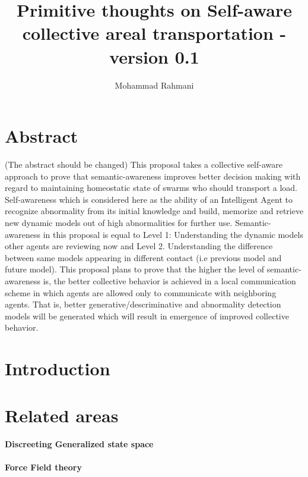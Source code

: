 \documentclass{article}
\begin{document}
	
	\title{Primitive thoughts on Self-aware collective areal transportation - version 0.1}
	\author{Mohammad Rahmani}
	\date{}
	\maketitle
	\section{Abstract}
	(The abstract should be changed)
	This proposal takes a collective self-aware approach to prove that semantic-awareness improves better decision making with regard to maintaining homeostatic state of swarms who should transport a load. Self-awareness which is considered here as the ability of an Intelligent Agent to recognize abnormality from its initial knowledge and build, memorize and retrieve new dynamic models out of high abnormalities for further use. Semantic-awareness in this proposal is equal to  Level 1: Understanding the dynamic models other agents are reviewing now and Level 2. Understanding the difference between same models appearing in different contact (i.e previous model and future model). This proposal plans to prove that the higher the level of semantic-awareness is, the better collective behavior is achieved in a local communication scheme in which agents are allowed only to communicate with neighboring agents. That is, better generative/descriminative and abnormality detection models will be generated which will result in emergence of improved collective behavior.   
	\section{Introduction}
	
	\section{Related areas}
		\paragraph{Discreeting Generalized state space}
		\paragraph{Force Field theory}
		\paragraph{}
	
\end{document}
